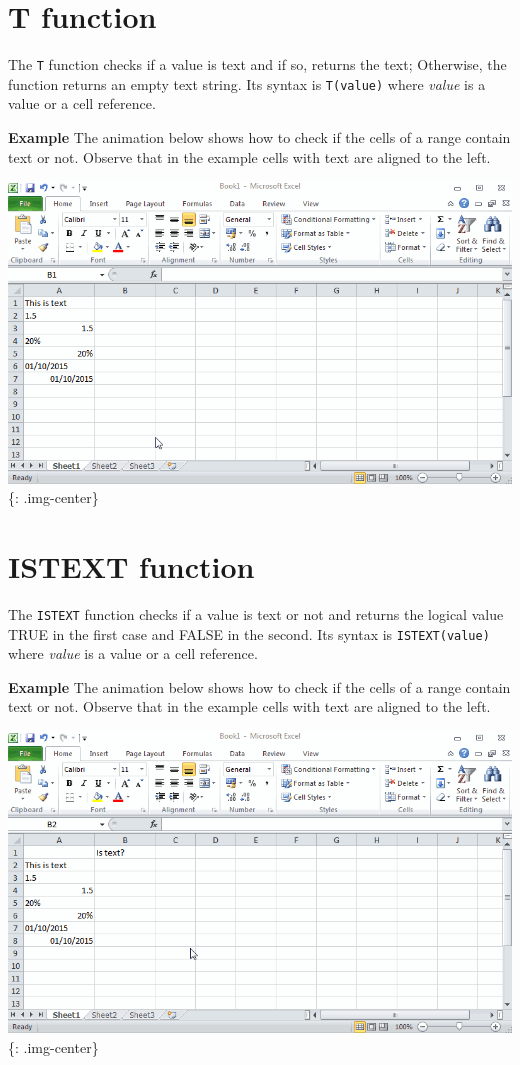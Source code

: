 \section{T function}
\label{tfunction}

The \texttt{T} function checks if a value is text and if so, returns the text; Otherwise, the function returns an empty text string. Its syntax is \texttt{T(value)} where \emph{value} is a value or a cell reference.

\textbf{Example} The animation below shows how to check if the cells of a range contain text or not. Observe that in the example cells with text are aligned to the left. 

\includegraphics[keepaspectratio,width=\textwidth,height=0.75\textheight]{img/example_function_t.gif}
\{: .img-center\}

\section{ISTEXT function}
\label{istextfunction}

The \texttt{ISTEXT} function checks if a value is text or not and returns the logical value TRUE in the first case and FALSE in the second. Its syntax is \texttt{ISTEXT(value)} where \emph{value} is a value or a cell reference.

\textbf{Example} The animation below shows how to check if the cells of a range contain text or not. Observe that in the example cells with text are aligned to the left. 

\includegraphics[keepaspectratio,width=\textwidth,height=0.75\textheight]{img/example_function_istext.gif}
\{: .img-center\}

